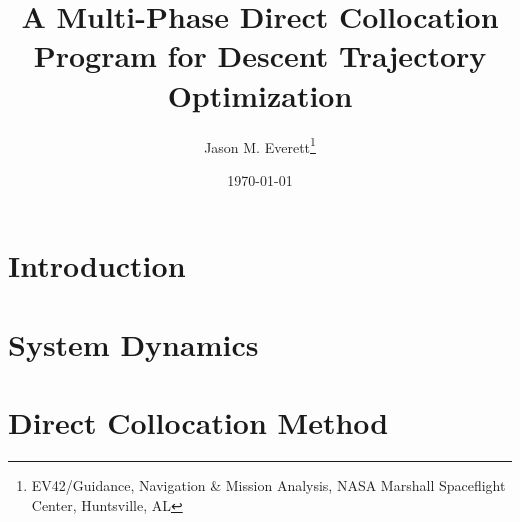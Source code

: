 \documentclass[10pt]{article}
\begin{document}
\title{\textbf{A Multi-Phase Direct Collocation Program for Descent Trajectory Optimization}}
\author{Jason M. Everett\thanks{EV42/Guidance, Navigation \& Mission Analysis, NASA Marshall Spaceflight Center, Huntsville, AL}}
\date{\printdayoff\today}

\maketitle

\newpage
\tableofcontents

\newpage
\section{Introduction}


\newpage
\section{System Dynamics}


\newpage
\section{Direct Collocation Method}

\end{document}
